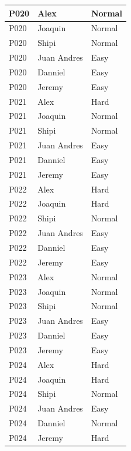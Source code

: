 \begin{longtable}{
    |
    >{\centering\arraybackslash}p{4.5cm}|
    >{\centering\arraybackslash}p{4.5cm}|
    >{\centering\arraybackslash}p{4.5cm}|
}
    P020 & Alex        & Normal \\ \hline
    P020 & Joaquin     & Normal \\ \hline
    P020 & Shipi       & Normal \\ \hline
    P020 & Juan Andres & Easy \\ \hline
    P020 & Danniel     & Easy \\ \hline
    P020 & Jeremy      & Easy \\ \hline

    P021 & Alex        & Hard \\ \hline
    P021 & Joaquin     & Normal \\ \hline
    P021 & Shipi       & Normal \\ \hline
    P021 & Juan Andres & Easy \\ \hline
    P021 & Danniel     & Easy \\ \hline
    P021 & Jeremy      & Easy \\ \hline

    P022 & Alex        & Hard \\ \hline
    P022 & Joaquin     & Hard \\ \hline
    P022 & Shipi       & Normal \\ \hline
    P022 & Juan Andres & Easy \\ \hline
    P022 & Danniel     & Easy \\ \hline
    P022 & Jeremy      & Easy \\ \hline

    P023 & Alex        & Normal \\ \hline
    P023 & Joaquin     & Normal \\ \hline
    P023 & Shipi       & Normal \\ \hline
    P023 & Juan Andres & Easy \\ \hline
    P023 & Danniel     & Easy \\ \hline
    P023 & Jeremy      & Easy \\ \hline

    P024 & Alex        & Hard \\ \hline
    P024 & Joaquin     & Hard \\ \hline
    P024 & Shipi       & Normal \\ \hline
    P024 & Juan Andres & Easy \\ \hline
    P024 & Danniel     & Normal \\ \hline
    P024 & Jeremy      & Hard \\ \hline


\end{longtable}
